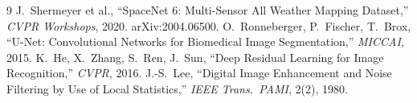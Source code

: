 \documentclass[11pt,a4paper]{article}
\begin{document}
\begin{thebibliography}{9}\small
{} J.~Shermeyer et al., ``SpaceNet 6: Multi-Sensor All Weather
Mapping Dataset,'' \emph{CVPR Workshops}, 2020. arXiv:2004.06500.
 O.~Ronneberger, P.~Fischer, T.~Brox, ``U-Net: Convolutional
Networks for Biomedical Image Segmentation,'' \emph{MICCAI}, 2015.
 K.~He, X.~Zhang, S.~Ren, J.~Sun, ``Deep Residual Learning for Image
Recognition,'' \emph{CVPR}, 2016.
 J.-S.~Lee, ``Digital Image Enhancement and Noise Filtering by Use of
Local Statistics,'' \emph{IEEE Trans.\ PAMI}, 2(2), 1980.
\end{thebibliography}
\end{document}
